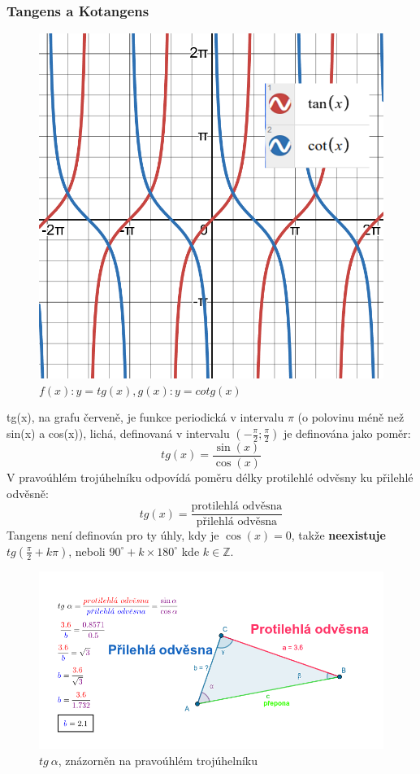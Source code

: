 \subsubsection{Tangens a Kotangens}
\begin{figure}[H]
        \centering
        \includegraphics[width=0.5\linewidth]{img/7_TgXCotgX.png}
        \caption{$f(x): y=tg(x), g(x): y=cotg(x)$} 
        \label{fig:Graf rovnice tg(x) a cotg(x)}
\end{figure}

tg(x), na grafu červeně, je funkce periodická v intervalu $\pi$ (o polovinu méně než sin(x) a cos(x)), lichá, definovaná v intervalu $(-\frac{\pi}{2};\frac{\pi}{2})$ je definována jako poměr:
$$
    tg(x) = \frac{\sin(x)}{\cos(x)}
$$
V pravoúhlém trojúhelníku odpovídá poměru délky protilehlé odvěsny ku přilehlé odvěsně:
$$
    tg(x) = \frac{\text{protilehlá odvěsna}}{\text{přilehlá odvěsna}}
$$
Tangens není definován pro ty úhly, kdy je $\cos(x) = 0$, takže \textbf{neexistuje} $tg\left(\frac{\pi}{2} + k\pi\right)$, neboli $90^{\circ}+ k \times 180^{\circ}$ kde $k \in \mathbb{Z}$. 

\begin{figure}[h]
    \centering
    \includegraphics[width=0.5\linewidth]{img/7_TrojuhlenikATangens.png}
    \caption{$tg\ \alpha$, znázorněn na pravoúhlém trojúhelníku}
    \label{fig:tangens-na-pravouhlem-trojuhelniku}
\end{figure}

